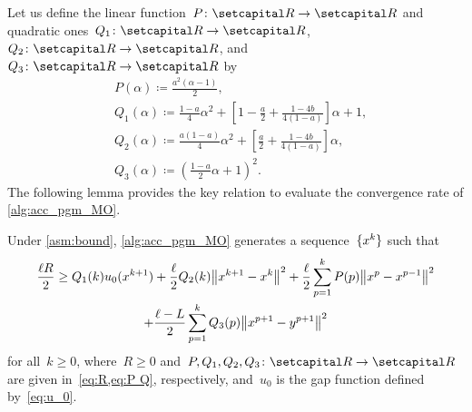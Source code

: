 \documentclass[../main]{subfiles}
\begin{document}
Let us define the linear function~$P \colon \setR \to \setR$ and quadratic ones~$Q_1 \colon \setR \to \setR$,~$Q_2 \colon \setR \to \setR$, and~$Q_3 \colon \setR \to \setR$ by
\[ \label{eq:P Q}
    \begin{aligned}
    &P(\alpha) \coloneqq \frac{a^2 (\alpha - 1)}{2},\\
    &Q_1(\alpha) \coloneqq \frac{1 - a}{4} \alpha^2 + \left[ 1 - \frac{a}{2} + \frac{1 - 4 b}{4 (1 - a)} \right] \alpha + 1,\\
    &Q_2(\alpha) \coloneqq \frac{a (1 - a)}{4} \alpha^2 + \left[ \frac{a}{2} + \frac{1 - 4 b}{4 (1 - a)} \right] \alpha, \\
    &Q_3(\alpha) \coloneqq \left( \frac{1 - a}{2} \alpha + 1 \right)^2
    .\end{aligned}
\]
The following lemma provides the key relation to evaluate the convergence rate of \cref{alg:acc_pgm_MO}.
\begin{lemma} \label{thm:acc conv rate}
    Under \cref{asm:bound}, \cref{alg:acc_pgm_MO} generates a sequence~$\lbrace x^k\rbrace$ such that
    \begin{multline}
        \frac{\ell R}{2} \ge Q_1(k) u_0(x^{k + 1}) + \frac{\ell}{2} Q_2(k) \norm*{x^{k + 1} - x^k}^2 + \frac{\ell}{2} \sum_{p = 1}^{k} P(p) \norm*{x^p - x^{p - 1}}^2 \\
         +  \frac{\ell - L}{2} \sum_{p = 1}^{k} Q_3(p) \norm*{x^{p + 1} - y^{p + 1}}^2
    \end{multline}
    for all~$k \ge 0$, where~$R \ge 0$ and~$P, Q_1, Q_2, Q_3 \colon \setR \to \setR$ are given in~\cref{eq:R,eq:P Q}, respectively, and~$u_0$ is the gap function defined by~\cref{eq:u_0}.
\end{lemma}
\end{document}
